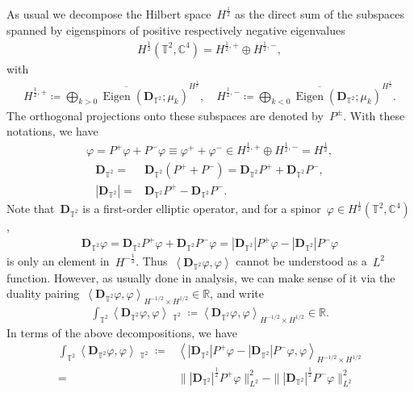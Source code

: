 \documentclass[11pt,final]{amsart}
\newcommand{\R}{\mathbb{R}}
\newcommand{\C}{\mathbb{C}}
\newcommand{\T}{\mathbb{T}}
\newcommand{\dd}{\mathop{}\!\mathrm{d}}
\newcommand{\pD}{\mathbf{D}}
\newcommand{\Abracket}[1]{\left<#1\right>} %
\DeclareMathOperator{\dv}{\dd{vol}}
\DeclareMathOperator{\Eigen}{Eigen}
\begin{document}
As usual we decompose the Hilbert space~$H^{\frac{1}{2}}$ as the direct sum of the subspaces spanned by eigenspinors of positive respectively negative eigenvalues
\begin{align}
    H^{\frac{1}{2}}(\mathbb{T}^2,\C^4)= H^{\frac{1}{2},+}\oplus H^{\frac{1}{2},-}, 
\end{align}
with 
\begin{align}
    H^{\frac{1}{2},+}\coloneqq \overline{ \bigoplus_{k>0} \Eigen(\pD_{\T^2};\mu_k) }^{H^{\frac{1}{2}}}, \quad 
    H^{\frac{1}{2},-}\coloneqq \overline{ \bigoplus_{k<0} \Eigen(\pD_{\T^2};\mu_k) }^{H^{\frac{1}{2}}} . 
\end{align}
The orthogonal projections onto these subspaces are denoted by~$P^{\pm}$. 
With these notations, we have 
\begin{align}
    \varphi=P^+\varphi + P^-\varphi \equiv \varphi^+ + \varphi^- \in H^{\frac{1}{2},+}\oplus H^{\frac{1}{2},-}=H^{\frac{1}{2}}, 
\end{align}
\begin{align}
    \pD_{\T^2}=&\pD_{\T^2}(P^+ + P^-) = \pD_{\T^2} P^+ + \pD_{\T^2} P^-,  \\
    |\pD_{\T^2}|=& \pD_{\T^2} P^+ - \pD_{\T^2} P^-. 
\end{align}
Note that~$\pD_{\T^2}$ is a first-order elliptic operator, and for a spinor~$\varphi\in H^{\frac{1}{2}}(\T^2,\C^4)$, 
\begin{align}
    \pD_{\T^2}\varphi = \pD_{\T^2}P^+\varphi + \pD_{\T^2}P^-\varphi 
    =|\pD_{\T^2}|P^+\varphi - |\pD_{\T^2}|P^-\varphi 
\end{align}
is only an element in~$H^{-\frac{1}{2}}$.
Thus~$\Abracket{\pD_{\T^2}\varphi,\varphi}$ cannot be understood as a~$L^2$ function. 
However, as usually done in analysis, we can make sense of it via the duality pairing~$\Abracket{\pD_{\T^2}\varphi,\varphi}_{H^{-1/2}\times H^{1/2}}\in \R$, and write 
\begin{align}
    \int_{\T^2}\Abracket{\pD_{\T^2}\varphi,\varphi}\dv_{\T^2}
    \coloneqq 
    \Abracket{\pD_{\T^2}\varphi,\varphi}_{H^{-1/2}\times H^{1/2}}\in \R. 
\end{align}
In terms of the above decompositions, we have 
\begin{align}
    \int_{\T^2}\Abracket{\pD_{\T^2}\varphi,\varphi}\dv_{\T^2}
    \coloneqq & 
    \Abracket{|\pD_{\T^2}|P^+\varphi - |\pD_{\T^2}|P^-\varphi ,\varphi}_{H^{-1/2}\times H^{1/2}} \\
    =&\| |\pD_{\T^2}|^{\frac{1}{2}}P^+\varphi\|_{L^2}^2 
     - \| |\pD_{\T^2}|^{\frac{1}{2}}P^-\varphi\|_{L^2}^2
\end{align}
\end{document}
